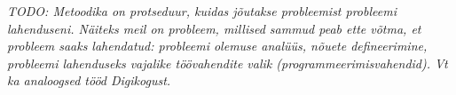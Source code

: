\textit{TODO: Metoodika on protseduur, kuidas jõutakse probleemist probleemi lahenduseni.
Näiteks meil on probleem, millised sammud peab ette võtma, et probleem saaks lahendatud: probleemi olemuse analüüs, nõuete defineerimine, 
probleemi lahenduseks vajalike töövahendite valik (programmeerimisvahendid). Vt ka analoogsed tööd Digikogust.
}

